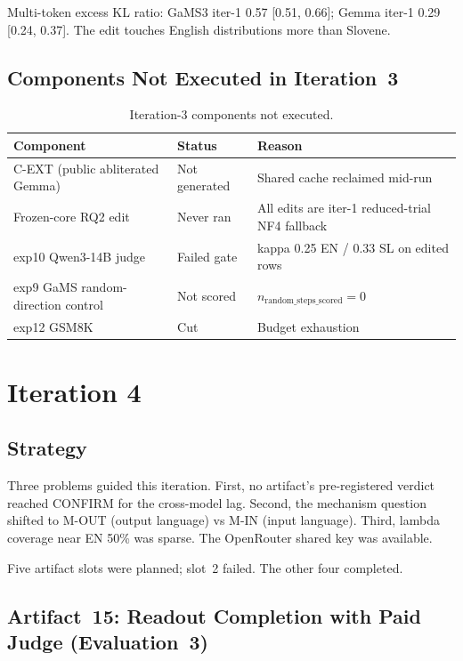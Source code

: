 \documentclass[11pt,letterpaper]{article}
\begin{document}
Multi-token excess KL ratio: GaMS3 iter-1 0.57 [0.51, 0.66]; Gemma iter-1 0.29 [0.24, 0.37]. The edit touches English distributions more than Slovene.


\subsection{Components Not Executed in Iteration~3}

\begin{table}[!htbp]
\centering
\caption{Iteration-3 components not executed.}
\label{tab:not_exec_iter3}
{\small
\begin{tabularx}{\linewidth}{lXX}
\toprule
Component & Status & Reason \\
\midrule
C-EXT (public abliterated Gemma) & Not generated & Shared cache reclaimed mid-run \\
Frozen-core RQ2 edit & Never ran & All edits are iter-1 reduced-trial NF4 fallback \\
exp10 Qwen3-14B judge & Failed gate & kappa 0.25 EN / 0.33 SL on edited rows \\
exp9 GaMS random-direction control & Not scored & $n_{\text{random\_steps\_scored}} = 0$ \\
exp12 GSM8K & Cut & Budget exhaustion \\
\bottomrule
\end{tabularx}
}
\end{table}


\section{Iteration 4}

\subsection{Strategy}

Three problems guided this iteration. First, no artifact's pre-registered verdict reached CONFIRM for the cross-model lag. Second, the mechanism question shifted to M-OUT (output language) vs M-IN (input language). Third, lambda coverage near EN 50\% was sparse. The OpenRouter shared key was available.

Five artifact slots were planned; slot~2 failed. The other four completed.

\subsection{Artifact~15: Readout Completion with Paid Judge (Evaluation~3)}
\label{gen_art_evaluation_3}
\end{document}
